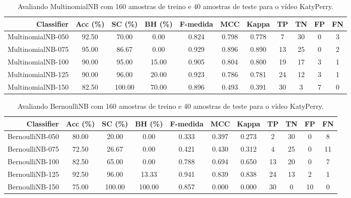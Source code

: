 \begin{table}[!htb]
\centering
\caption{Avaliando MultinomialNB com 160 amostras de treino e 40 amostras de teste para o vídeo KatyPerry.}
\label{tab:multinomial-nb-KatyPerry}
\begin{tabular}{r|c|c|c|c|c|c|c|c|c|c}
\hline\hline
Classifier & Acc (\%) & SC (\%) & BH (\%) & F-medida & MCC & Kappa & TP & TN & FP & FN \\ \hline
MultinomialNB-050 & 92.50 & 70.00 & 0.00 & 0.824 & 0.798 & 0.778 & 7 & 30 & 0 & 3 \\ 
MultinomialNB-075 & 95.00 & 86.67 & 0.00 & 0.929 & 0.896 & 0.890 & 13 & 25 & 0 & 2 \\ 
MultinomialNB-100 & 90.00 & 95.00 & 15.00 & 0.905 & 0.804 & 0.800 & 19 & 17 & 3 & 1 \\ 
MultinomialNB-125 & 90.00 & 96.00 & 20.00 & 0.923 & 0.786 & 0.781 & 24 & 12 & 3 & 1 \\ 
MultinomialNB-150 & 82.50 & 100.00 & 70.00 & 0.896 & 0.493 & 0.391 & 30 & 3 & 7 & 0 \\ 
\hline\hline
\end{tabular}
\end{table}
\begin{table}[!htb]
\centering
\caption{Avaliando BernoulliNB com 160 amostras de treino e 40 amostras de teste para o vídeo KatyPerry.}
\label{tab:bernoulli-nb-KatyPerry}
\begin{tabular}{r|c|c|c|c|c|c|c|c|c|c}
\hline\hline
Classifier & Acc (\%) & SC (\%) & BH (\%) & F-medida & MCC & Kappa & TP & TN & FP & FN \\ \hline
BernoulliNB-050 & 80.00 & 20.00 & 0.00 & 0.333 & 0.397 & 0.273 & 2 & 30 & 0 & 8 \\ 
BernoulliNB-075 & 72.50 & 26.67 & 0.00 & 0.421 & 0.430 & 0.312 & 4 & 25 & 0 & 11 \\ 
BernoulliNB-100 & 82.50 & 65.00 & 0.00 & 0.788 & 0.694 & 0.650 & 13 & 20 & 0 & 7 \\ 
BernoulliNB-125 & 92.50 & 96.00 & 13.33 & 0.941 & 0.839 & 0.838 & 24 & 13 & 2 & 1 \\ 
BernoulliNB-150 & 75.00 & 100.00 & 100.00 & 0.857 & 0.000 & 0.000 & 30 & 0 & 10 & 0 \\ 
\hline\hline
\end{tabular}
\end{table}
